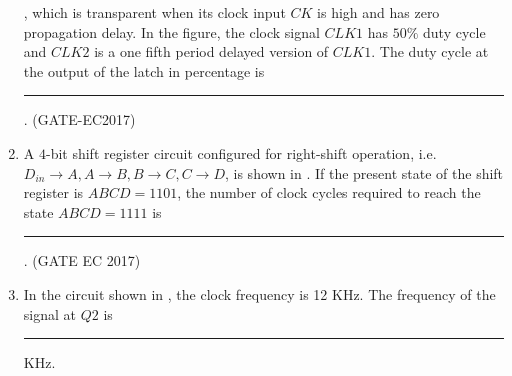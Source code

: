 \begin{enumerate}[label=\arabic*.,ref=\theenumi]
	,
		which is transparent when its clock input $CK$ is high and has zero propagation delay. In the figure, the clock signal $CLK1$ has $50\%$ duty cycle and $CLK2$ is a one fifth period delayed version of $CLK1$. The duty cycle at the output of the latch in percentage is \rule{1cm}{1pt}.
  \hfill(GATE-EC2017)
	\begin{figure}[H]
    \centering
    \resizebox{0.75\columnwidth}{!}{%
			      
	}
    \caption{}
	\label{fig:GATE-EC2017}
\end{figure}
\item A $4$-bit shift register circuit configured for right-shift operation, i.e.\\ $D_{in} \rightarrow A, A \rightarrow B, B \rightarrow C, C \rightarrow D$, is shown
	in .
 If the present state of the shift register is $ABCD = 1101$, the number of clock cycles required to reach the state $ABCD = 1111$ is
\rule{1cm}{0.1pt}.
\hfill (GATE EC 2017)
	\begin{figure}[H]
    \centering
    \resizebox{0.4\columnwidth}{!}{%
	
		}
 	\caption{}
	\label{fig:GATE-EC-2017}
\end{figure}
%
\item In the circuit shown
	in ,
the clock frequency is 12 KHz. The frequency of the signal at $Q2$ is  \rule{1cm}{0.1pt} KHz.


\end{enumerate}
